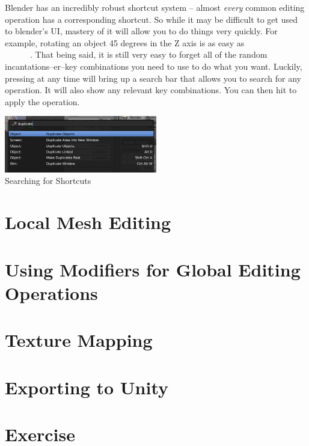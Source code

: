 \documentclass[11pt]{article}
\begin{document}
Blender has an incredibly robust shortcut system -- almost \textit{every} common editing operation
has a corresponding shortcut.  So while it may be difficult to get used to blender's UI, mastery of
it will allow you to do things very quickly.  For example, rotating an object 45 degrees in
the Z axis is as easy as \\ \faAngleRight\  \faAngleRight\  \faAngleRight\ 
 \faAngleRight\ \keys{\return}.  That being said, it is still very easy to forget all of the random 
incantations--er--key combinations you need to use to do what you want.  Luckily, pressing \keys{Space} at
any time will bring up a search bar that allows you to search for any operation.  It will also show any
relevant key combinations.  You can then hit \keys{\return} to apply the operation.

\begin{center}
    \includegraphics[width=0.5\textwidth]{search-diag}\\
    Searching for Shortcuts
\end{center}

\section{Local Mesh Editing}

\section{Using Modifiers for Global Editing Operations}

\section{Texture Mapping}

\section{Exporting to Unity}

\section{Exercise}
\end{document}
